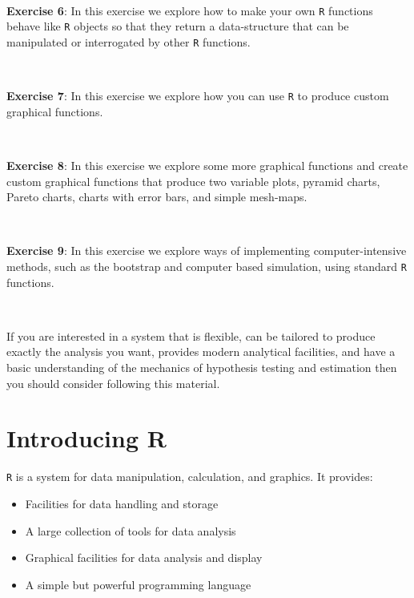 \documentclass[12pt,a4paper]{book}
\theoremstyle{definition}
\theoremstyle{definition}
\theoremstyle{definition}
\theoremstyle{remark}
\begin{document}
~

\textbf{Exercise 6}: In this exercise we explore how to make your own
\texttt{R} functions behave like \texttt{R} objects so that they return
a data-structure that can be manipulated or interrogated by other
\texttt{R} functions.

~

\textbf{Exercise 7}: In this exercise we explore how you can use
\texttt{R} to produce custom graphical functions.

~

\textbf{Exercise 8}: In this exercise we explore some more graphical
functions and create custom graphical functions that produce two
variable plots, pyramid charts, Pareto charts, charts with error bars,
and simple mesh-maps.

~

\textbf{Exercise 9}: In this exercise we explore ways of implementing
computer-intensive methods, such as the bootstrap and computer based
simulation, using standard \texttt{R} functions.

~

If you are interested in a system that is flexible, can be tailored to
produce exactly the analysis you want, provides modern analytical
facilities, and have a basic understanding of the mechanics of
hypothesis testing and estimation then you should consider following
this material.

\hypertarget{introducing-r}{%
\chapter*{Introducing R}\label{introducing-r}}

\texttt{R} is a system for data manipulation, calculation, and graphics.
It provides:

\begin{itemize}
\item
  Facilities for data handling and storage
\item
  A large collection of tools for data analysis
\item
  Graphical facilities for data analysis and display
\item
  A simple but powerful programming language
\end{itemize}
\end{document}
